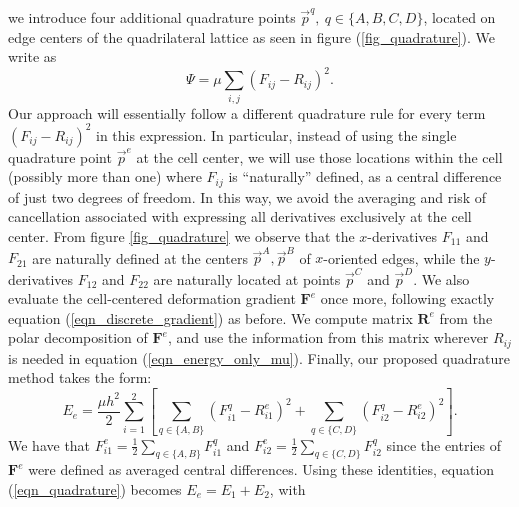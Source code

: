 \cite{Harlow:1965:MAC}\cite{gerritsma:1996:viscoelastic,Goktekin:2004:viscoelastic}   we introduce four
additional quadrature points $\vec{p}^q,\ q\in\{A,B,C,D\}$, located on edge centers of the quadrilateral lattice as seen in figure (\ref{fig_quadrature}). We write \newtext{$\Psi$ }as
\begin{equation}
\Psi=\mu\sum_{i,j}
  (F_{ij}-R_{ij})^2.
\label{eqn_energy_only_mu}
\end{equation}
Our approach will essentially follow a different quadrature rule for every term $(F_{ij}-R_{ij})^2$ in this expression. In particular, instead of using the single quadrature point
$\vec{p}^e$ at the cell center, we will use those locations within the cell (possibly more than one) where $F_{ij}$ is ``naturally'' defined, as a central difference of just two degrees
of freedom. In this way, we avoid the averaging and risk of cancellation associated with expressing all derivatives exclusively at the cell center. From figure \ref{fig_quadrature} we
observe that the $x$-derivatives $F_{11}$ and $F_{21}$ are naturally defined at the centers $\vec{p}^A,\vec{p}^B$ of $x$-oriented edges, while the $y$-derivatives $F_{12}$ and $F_{22}$
are naturally located at points $\vec{p}^C$ and $\vec{p}^D$. We also evaluate the cell-centered deformation gradient $\mathbf{F}^e$ once more, following exactly equation
(\ref{eqn_discrete_gradient}) as before. We compute matrix $\mathbf{R}^e$ from the polar decomposition of $\mathbf{F}^e$, and use the information from this matrix wherever $R_{ij}$ is needed 
in equation (\ref{eqn_energy_only_mu}). Finally, our proposed quadrature method takes the form:
\begin{equation}
\!E_e=\frac{\mu h^2}{2}\sum_{i=1}^2\left[\sum_{q\in\{A,B\}}\!\!\!\!\left(F_{i1}^q\!-\!R_{i1}^e\right)^2+\!\!\!\!\sum_{q\in\{C,D\}}\!\!\!\!\left(F_{i2}^q\!-\!R_{i2}^e\right)^2\right].
\label{eqn_quadrature}
\end{equation}
We have that $F_{i1}^e\!=\!\frac{1}{2}\sum_{q\in\{A,B\}}F_{i1}^q$ and $F_{i2}^e\!=\!\frac{1}{2}\sum_{q\in\{C,D\}}F_{i2}^q$ since the entries of $\mathbf{F}^e$ were defined as averaged
central differences. Using these identities, equation (\ref{eqn_quadrature}) becomes $E_e=E_1+E_2$, with
